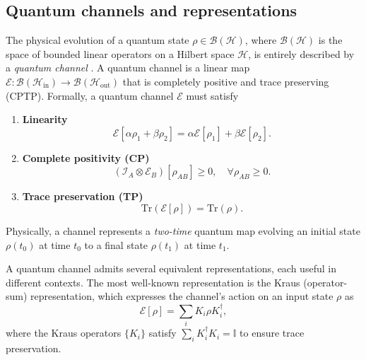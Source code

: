 \documentclass[
    aps,
    prx,
    reprint,
    superscriptaddress,
    longbibliography,
    nofootinbib,
    floatfix,
]{revtex4-2}
\newcommand{\Tr}{\mathrm{Tr}}
\begin{document}
\subsection{Quantum channels and representations}
The physical evolution of a quantum state \(\rho \in \mathcal{B}(\mathcal{H})\), where \(\mathcal{B}(\mathcal{H})\) is the space of bounded linear operators on a Hilbert space \(\mathcal{H}\), is entirely described by a \emph{quantum channel} \cite{nielsenQuantumComputationQuantum2010}. A quantum channel is a linear map \(\mathcal{E}: \mathcal{B}(\mathcal{H}_{\mathrm{in}}) \to \mathcal{B}(\mathcal{H}_{\mathrm{out}})\) that is completely positive and trace preserving (CPTP). Formally, a quantum channel \(\mathcal{E}\) must satisfy
\begin{enumerate}
\item \textbf{Linearity}
\begin{equation}
    \mathcal{E}[\alpha\rho_1+\beta\rho_2]=\alpha\mathcal{E}[\rho_1]+\beta\mathcal{E}[\rho_2].
\end{equation}
\item \textbf{Complete positivity (CP)}
\begin{equation}
    (\mathcal{I}_A\otimes \mathcal{E}_B)[\rho_{AB}]\geq 0, \quad \forall \rho_{AB} \ge 0.
\end{equation}
\item \textbf{Trace preservation (TP)}
\begin{equation}
    \Tr(\mathcal{E}[\rho]) = \Tr(\rho).
\end{equation}
\end{enumerate}

Physically, a channel represents a \emph{two-time} quantum map evolving an initial state \(\rho(t_0)\) at time \(t_0\) to a final state \(\rho(t_1)\) at time \(t_1\).

A quantum channel admits several equivalent representations, each useful in different contexts. The most well-known representation is the Kraus (operator-sum) representation, which expresses the channel's action on an input state \(\rho\) as
\begin{equation}
    \mathcal{E}[\rho] = \sum_i K_i \rho K_i^\dagger,
\end{equation}
where the Kraus operators \(\{K_i\}\) satisfy \(\sum_i K_i^\dagger K_i = \mathbb{I}\) to ensure trace preservation. 
\end{document}
